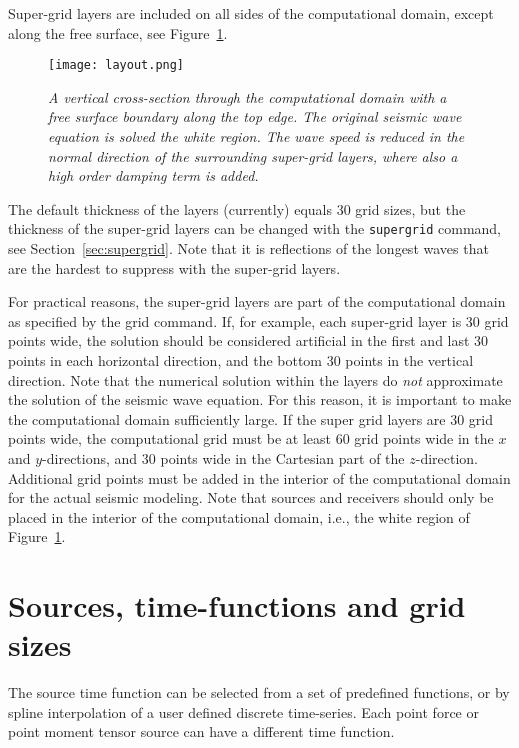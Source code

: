\documentclass[11pt]{report}
\begin{document}
Super-grid layers are included on all sides of the computational domain, except along the
free surface, see Figure~\ref{fig:layout}.
\begin{figure}[th]
\begin{center}
\texttt{[image: layout.png]}
\caption{\em A vertical cross-section through the computational domain with a free surface boundary
  along the top edge. The original seismic wave equation is solved the white region. The wave speed
  is reduced in the normal direction of the surrounding super-grid layers, where also a high order
  damping term is added.}\label{fig:layout}
\end{center}
\end{figure}
The default thickness of the layers (currently) equals 30 grid sizes, but the thickness of the
super-grid layers can be changed with the {\tt supergrid} command, see
Section~\ref{sec:supergrid}. Note that it is reflections of the longest waves that are the hardest
to suppress with the super-grid layers.

For practical reasons, the super-grid layers are part of the computational domain as specified by
the grid command. If, for example, each super-grid layer is 30 grid points wide, the solution
should be considered artificial in the first and last 30 points in each horizontal direction, and
the bottom 30 points in the vertical direction. Note that the numerical solution within the layers
do {\em not} approximate the solution of the seismic wave equation. For this reason, it is important
to make the computational domain sufficiently large. If the super grid layers are 30 grid points
wide, the computational grid must be at least 60 grid points wide in the $x$ and $y$-directions, and
30 points wide in the Cartesian part of the $z$-direction. Additional grid points must be added in
the interior of the computational domain for the actual seismic modeling. Note that sources and
receivers should only be placed in the interior of the computational domain, i.e., the white region
of Figure~\ref{fig:layout}.

\chapter{Sources, time-functions and grid sizes}

The source time function can be selected from a set of predefined functions, or by spline
interpolation of a user defined discrete time-series. Each point force or point moment tensor source
can have a different time function. 
\end{document}
